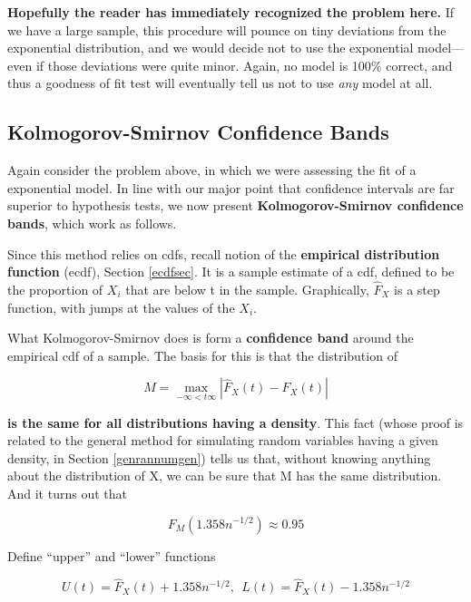 {\bf Hopefully the reader has immediately recognized the problem here.}
If we have a large sample, this procedure will pounce on tiny deviations
from the exponential distribution, and we would decide not to use the
exponential model---even if those deviations were quite minor.  Again,
no model is 100\% correct, and thus a goodness of fit test will
eventually tell us not to use {\it any} model at all.


\subsection{Kolmogorov-Smirnov Confidence Bands}
\label{kolsmi}

Again consider the problem above, in which we were assessing the fit of
a exponential model.  In line with our major point that confidence
intervals are far superior to hypothesis tests, we now present {\bf
Kolmogorov-Smirnov confidence bands}, which work as follows.

Since this method relies on cdfs, recall  
notion of the {\bf empirical distribution function} (ecdf), Section
\ref{ecdfsec}.
It is a sample estimate of a cdf, defined to be the proportion
of $X_i$ that are below t in the sample.  Graphically, $\widehat{F}_X$
is a step function, with jumps at the values of the $X_i$.

What Kolmogorov-Smirnov does is form a {\bf confidence band} around the
empirical cdf of a sample.  The basis for this is that the distribution
of

\begin{equation}
\label{definem}
M = \max_{-\infty < t \infty} |\widehat{F}_X(t) - F_X(t)|
\end{equation}

{\bf is the same for all distributions having a density}.  This 
fact (whose proof is related to the general method for simulating random
variables having a given density, in Section \ref{genrannumgen})
tells us that, without knowing anything about the distribution of
X, we can be sure that M has the same distribution.  And it turns out
that

\begin{equation}
\label{m95}
F_M(1.358 n^{-1/2}) \approx 0.95
\end{equation}

Define ``upper'' and ``lower'' functions

\begin{equation}
U(t) = \widehat{F}_X(t) + 1.358 n^{-1/2}, ~~
L(t) = \widehat{F}_X(t) - 1.358 n^{-1/2}
\end{equation}

